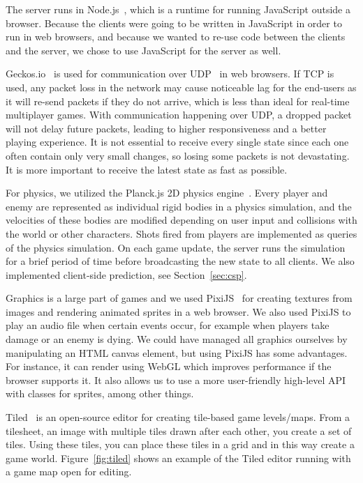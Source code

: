 \documentclass[a4paper]{article}
\begin{document}
The server runs in Node.js~\cite{nodejs}, which is a runtime for running JavaScript outside a browser. Because the clients were going to be written in JavaScript in order to run in web browsers, and because we wanted to re-use code between the clients and the server, we chose to use JavaScript for the server as well.

Geckos.io~\cite{geckos} is used for communication over UDP~\cite{rfc768} in web browsers. If TCP is used, any packet loss in the network may cause noticeable lag for the end-users as it will re-send packets if they do not arrive, which is less than ideal for real-time multiplayer games. With communication happening over UDP, a dropped packet will not delay future packets, leading to higher responsiveness and a better playing experience. It is not essential to receive every single state since each one often contain only very small changes, so losing some packets is not devastating. It is more important to receive the latest state as fast as possible.

For physics, we utilized the Planck.js 2D physics engine~\cite{planckjs}. Every player and enemy are represented as individual rigid bodies in a physics simulation, and the velocities of these bodies are modified depending on user input and collisions with the world or other characters. Shots fired from players are implemented as queries of the physics simulation. On each game update, the server runs the simulation for a brief period of time before broadcasting the new state to all clients. We also implemented client-side prediction, see Section~\ref{sec:csp}.

Graphics is a large part of games and we used PixiJS~\cite{pixijs} for creating textures from images and rendering animated sprites in a web browser. We also used PixiJS to play an audio file when certain events occur, for example when players take damage or an enemy is dying. We could have managed all graphics ourselves by manipulating an HTML canvas element, but using PixiJS has some advantages. For instance, it can render using WebGL which improves performance if the browser supports it. It also allows us to use a more user-friendly high-level API with classes for sprites, among other things.

Tiled~\cite{tiled} is an open-source editor for creating tile-based game levels/maps. From a tilesheet, an image with multiple tiles drawn after each other, you create a set of tiles. Using these tiles, you can place these tiles in a grid and in this way create a game world. Figure~\ref{fig:tiled} shows an example of the Tiled editor running with a game map open for editing.
\end{document}
